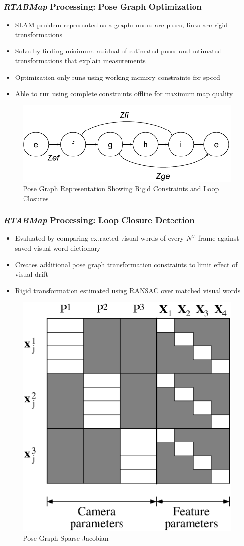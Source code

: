 \documentclass{beamer}
\begin{document}
\begin{frame}
\frametitle{\textit{RTABMap} Processing: Pose Graph Optimization}
\vspace{1.6\baselineskip}
\begin{itemize}
\item{SLAM problem represented as a graph: nodes are poses, links are rigid transformations}
\item{Solve by finding minimum residual of estimated poses and estimated transformations that explain measurements}
\item{Optimization only runs using working memory constraints for speed}
\item{Able to run using complete constraints offline for maximum map quality}
\end{itemize}
\begin{figure}
\includegraphics[width=0.5\linewidth]{figures/PoseGraph}
\caption{Pose Graph Representation Showing Rigid Constraints and Loop Closures}
\end{figure}
\end{frame}


\begin{frame}
\frametitle{\textit{RTABMap} Processing: Loop Closure Detection}
\vspace{1.6\baselineskip}
\begin{itemize}
\item{Evaluated by comparing extracted visual words of every \textit{N}$^{th}$ frame against saved visual word dictionary}
\item{Creates additional pose graph transformation constraints to limit effect of visual drift}
\item{Rigid transformation estimated using RANSAC over matched visual words}
\end{itemize}
\begin{figure}
\includegraphics[width=0.3\linewidth]{figures/appendixfigs-sparse-jacobian}
\caption{Pose Graph Sparse Jacobian}
\end{figure}
\end{frame}
\end{document}
